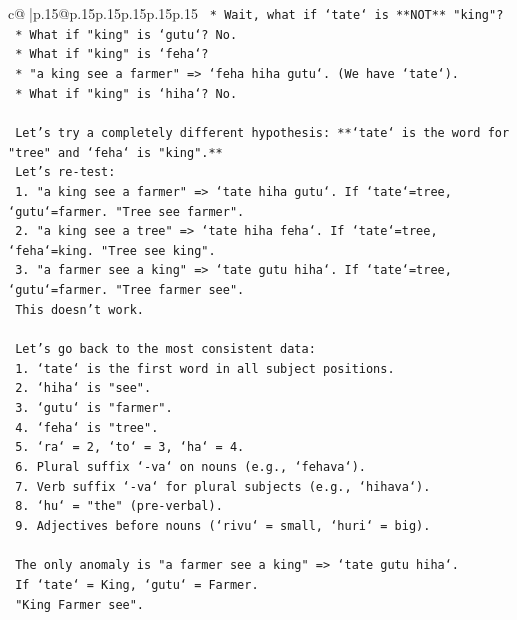 \documentclass{article}
\begin{document}
{\begin{supertabular}{c@{$\;$}|p{.15\linewidth}@{}p{.15\linewidth}p{.15\linewidth}p{.15\linewidth}p{.15\linewidth}p{.15\linewidth}}
{{{\texttt{    *   Wait, what if `tate` is **NOT** "king"?} \\
\texttt{    *   What if "king" is `gutu`? No.} \\
\texttt{    *   What if "king" is `feha`?} \\
\texttt{    *   "a king see a farmer" => `feha hiha gutu`. (We have `tate`).} \\
\texttt{    *   What if "king" is `hiha`? No.} \\
\\ 
\texttt{    Let's try a completely different hypothesis: **`tate` is the word for "tree" and `feha` is "king".**} \\
\texttt{    Let's re{-}test:} \\
\texttt{    1. "a king see a farmer" => `tate hiha gutu`. If `tate`=tree, `gutu`=farmer. "Tree see farmer".} \\
\texttt{    2. "a king see a tree" => `tate hiha feha`. If `tate`=tree, `feha`=king. "Tree see king".} \\
\texttt{    3. "a farmer see a king" => `tate gutu hiha`. If `tate`=tree, `gutu`=farmer. "Tree farmer see".} \\
\texttt{    This doesn't work.} \\
\\ 
\texttt{    Let's go back to the most consistent data:} \\
\texttt{    1. `tate` is the first word in all subject positions.} \\
\texttt{    2. `hiha` is "see".} \\
\texttt{    3. `gutu` is "farmer".} \\
\texttt{    4. `feha` is "tree".} \\
\texttt{    5. `ra` = 2, `to` = 3, `ha` = 4.} \\
\texttt{    6. Plural suffix `{-}va` on nouns (e.g., `fehava`).} \\
\texttt{    7. Verb suffix `{-}va` for plural subjects (e.g., `hihava`).} \\
\texttt{    8. `hu` = "the" (pre{-}verbal).} \\
\texttt{    9. Adjectives before nouns (`rivu` = small, `huri` = big).} \\
\\ 
\texttt{    The only anomaly is "a farmer see a king" => `tate gutu hiha`.} \\
\texttt{    If `tate` = King, `gutu` = Farmer.} \\
\texttt{    "King Farmer see".} \\
}}}
\end{supertabular}}
\end{document}
